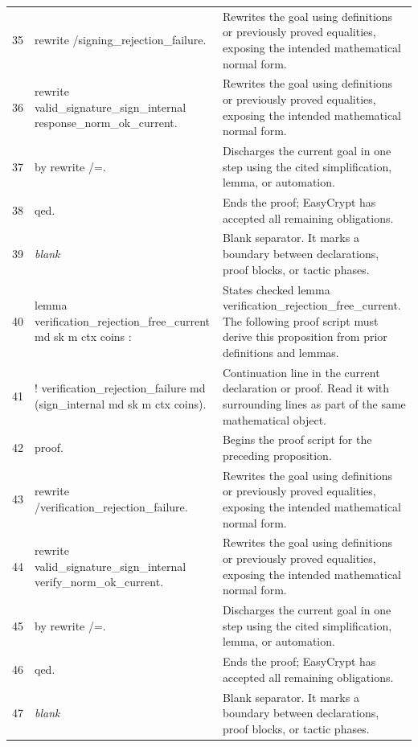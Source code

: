 \documentclass[10pt]{article}
\begin{document}
\begin{longtable}{r L{0.53\textwidth} L{0.37\textwidth}}
35 & {\ttfamily\scriptsize rewrite /signing\_rejection\_failure.} & Rewrites the goal using definitions or previously proved equalities, exposing the intended mathematical normal form. \\
36 & {\ttfamily\scriptsize rewrite valid\_signature\_sign\_internal response\_norm\_ok\_current.} & Rewrites the goal using definitions or previously proved equalities, exposing the intended mathematical normal form. \\
37 & {\ttfamily\scriptsize by rewrite /=.} & Discharges the current goal in one step using the cited simplification, lemma, or automation. \\
38 & {\ttfamily\scriptsize qed.} & Ends the proof; EasyCrypt has accepted all remaining obligations. \\
39 & {\ttfamily\scriptsize \emph{blank}} & Blank separator.  It marks a boundary between declarations, proof blocks, or tactic phases. \\
40 & {\ttfamily\scriptsize lemma verification\_rejection\_free\_current md sk m ctx coins :} & States checked lemma verification\_rejection\_free\_current.  The following proof script must derive this proposition from prior definitions and lemmas. \\
41 & {\ttfamily\scriptsize   ! verification\_rejection\_failure md (sign\_internal md sk m ctx coins).} & Continuation line in the current declaration or proof.  Read it with surrounding lines as part of the same mathematical object. \\
42 & {\ttfamily\scriptsize proof.} & Begins the proof script for the preceding proposition. \\
43 & {\ttfamily\scriptsize rewrite /verification\_rejection\_failure.} & Rewrites the goal using definitions or previously proved equalities, exposing the intended mathematical normal form. \\
44 & {\ttfamily\scriptsize rewrite valid\_signature\_sign\_internal verify\_norm\_ok\_current.} & Rewrites the goal using definitions or previously proved equalities, exposing the intended mathematical normal form. \\
45 & {\ttfamily\scriptsize by rewrite /=.} & Discharges the current goal in one step using the cited simplification, lemma, or automation. \\
46 & {\ttfamily\scriptsize qed.} & Ends the proof; EasyCrypt has accepted all remaining obligations. \\
47 & {\ttfamily\scriptsize \emph{blank}} & Blank separator.  It marks a boundary between declarations, proof blocks, or tactic phases. \\

\end{longtable}
\end{document}
